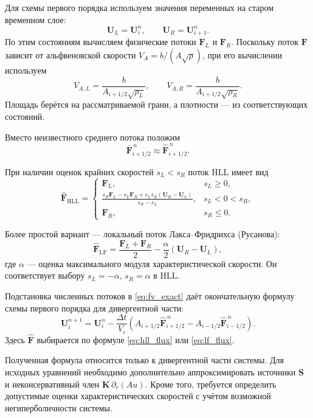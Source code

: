 \documentclass[11pt,a4paper]{article}
\providecommand{\U}{}
\renewcommand{\U}{\bm U}
\newcommand{\F}{\bm F}
\newcommand{\Src}{\bm S}
\begin{document}
Для схемы первого порядка используем
значения переменных на старом временном слое:
\[
\U_L=\U_i^n,\qquad
\U_R=\U_{i+1}^n.
\]
По этим состояниям вычисляем физические потоки
$\F_L$ и $\F_R$. Поскольку поток $\F$
зависит от альфвеновской скорости
$V_A=b/(A\sqrt{\rho})$, при его вычислении
используем
\[
V_{A,L}=\frac{b}{A_{i+1/2}\sqrt{\rho_L}},
\qquad
V_{A,R}=\frac{b}{A_{i+1/2}\sqrt{\rho_R}}.
\]
Площадь берётся на рассматриваемой грани,
а плотности --- из соответствующих состояний.

Вместо неизвестного среднего потока положим
\[
\overline{\F}_{i+1/2}^{\,n}
\approx\widehat{\F}_{i+1/2}^{\,n}.
\]

При наличии оценок крайних скоростей
$s_L<s_R$ поток HLL имеет вид
\begin{equation}
\widehat{\F}_{\mathrm{HLL}}=
\begin{cases}
\F_L, & s_L\ge0,\\[3pt]
\displaystyle
\frac{s_R\F_L-s_L\F_R+s_Ls_R(\U_R-\U_L)}
{s_R-s_L},
& s_L<0<s_R,\\[8pt]
\F_R, & s_R\le0.
\end{cases}
\label{eq:hll_flux}
\end{equation}

Более простой вариант --- локальный поток
Лакса--Фридрихса (Русанова):
\begin{equation}
\widehat{\F}_{\mathrm{LF}}
=\frac{\F_L+\F_R}{2}
-\frac{\alpha}{2}(\U_R-\U_L),
\label{eq:lf_flux}
\end{equation}
где $\alpha$ --- оценка максимального модуля
характеристической скорости.
Он соответствует выбору
$s_L=-\alpha$, $s_R=\alpha$ в HLL.

Подстановка численных потоков в
\eqref{eq:fv_exact} даёт окончательную формулу
схемы первого порядка для дивергентной части:
\begin{equation}
\boxed{
\U_i^{n+1}
=\U_i^n
-\frac{\Delta t}{V_i}
\left(
A_{i+1/2}\widehat{\F}_{i+1/2}^{\,n}
-A_{i-1/2}\widehat{\F}_{i-1/2}^{\,n}
\right).
}
\label{eq:fv_flux}
\end{equation}
Здесь $\widehat{\F}$ выбирается по формуле
\eqref{eq:hll_flux} или \eqref{eq:lf_flux}.

Полученная формула относится только
к дивергентной части системы.
Для исходных уравнений необходимо дополнительно
аппроксимировать источники $\Src$
и неконсервативный член
$\bm K\,\partial_r(Au)$.
Кроме того, требуется определить допустимые
оценки характеристических скоростей
с учётом возможной негиперболичности системы.
\end{document}
